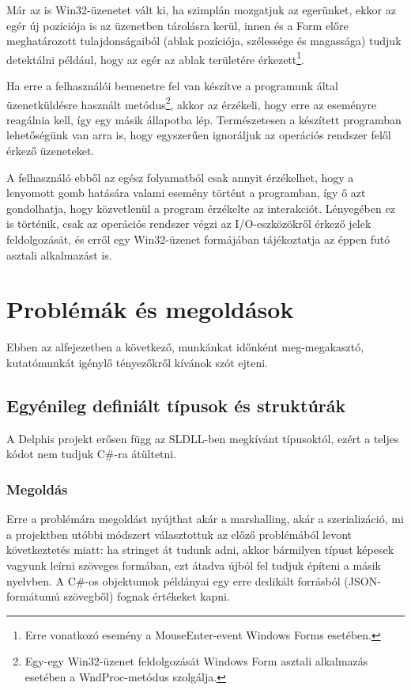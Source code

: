 \documentclass[tocnopagenum]{thesis-ekf}
\theoremstyle{definition}
\theoremstyle{remark}
\begin{document}
	Már az is Win32-üzenetet vált ki, ha szimplán mozgatjuk az egerünket, ekkor az egér új pozíciója is az üzenetben tárolásra kerül, innen és a Form előre meghatározott tulajdonságaiból (ablak pozíciója, szélessége és magassága) tudjuk detektálni például, hogy az egér az ablak területére érkezett\footnote{Erre vonatkozó esemény a MouseEnter-event Windows Forms esetében.}.

	Ha erre a felhasználói bemenetre fel van készítve a programunk által üzenetküldésre használt metódus\footnote{Egy-egy Win32-üzenet feldolgozását Windows Form asztali alkalmazás esetében a WndProc-metódus szolgálja.}, akkor az érzékeli, hogy erre az eseményre reagálnia kell, így egy másik állapotba lép. Természetesen a készített programban lehetőségünk van arra is, hogy egyszerűen ignoráljuk az operációs rendszer felől érkező üzeneteket.
	
	A felhasználó ebből az egész folyamatból csak annyit érzékelhet, hogy a lenyomott gomb hatására valami esemény történt a programban, így ő azt gondolhatja, hogy közvetlenül a program érzékelte az interakciót. Lényegében ez is történik, csak az operációs rendszer végzi az I/O-eszközökről érkező jelek feldolgozását, és erről egy Win32-üzenet formájában tájékoztatja az éppen futó asztali alkalmazást is.
	\section{Problémák és megoldások}
	Ebben az alfejezetben a következő, munkánkat időnként meg-megakasztó, kutatómunkát igénylő tényezőkről kívánok szót ejteni.
	\subsection{Egyénileg definiált típusok és struktúrák}
	A Delphis projekt erősen függ az SLDLL-ben megkívánt típusoktól, ezért a teljes kódot nem tudjuk C\#-ra átültetni.
	\subsubsection{Megoldás} 
	Erre a problémára megoldást nyújthat akár a marshalling, akár a szerializáció, mi a projektben utóbbi módszert választottuk az előző problémából levont következtetés miatt: ha stringet át tudunk adni, akkor bármilyen típust képesek vagyunk leírni szöveges formában, ezt átadva újból fel tudjuk építeni a másik nyelvben. A C\#-os objektumok példányai egy erre dedikált forrásból (JSON-formátumú szövegből) fognak értékeket kapni.
\end{document}
